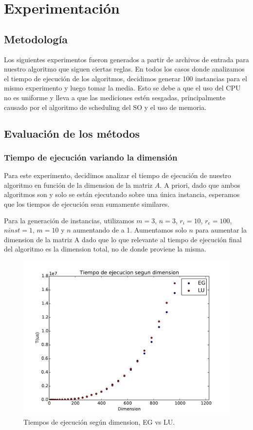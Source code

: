 \section{Experimentación}

\subsection{Metodología}

Los siguientes experimentos fueron generados a partir de archivos de entrada para nuestro algoritmo que siguen ciertas reglas. En todos los casos donde analizamos el tiempo de ejecución de los algoritmos, decidimos generar 100 instancias para el mismo experimento y luego tomar la media. Esto se debe a que el uso del CPU no es uniforme y lleva a que las mediciones estén sesgadas, principalmente causado por el algoritmo de scheduling del SO y el uso de memoria.

\subsection{Evaluación de los métodos}

\subsubsection{Tiempo de ejecución variando la dimensión}

Para este experimento, decidimos analizar el tiempo de ejecución de nuestro algoritmo en función de la dimension de la matriz $A$. A priori, dado que ambos algoritmos son  y solo se están ejecutando sobre una única instancia, esperamos que los tiempos de ejecución sean sumamente similares.

Para la generación de instancias, utilizamos $m = 3$, $n = 3$, $r_i = 10$, $r_e = 100$, $ninst = 1$, $m = 10$ y $n$ aumentando de a 1. Aumentamos solo $n$ para aumentar la dimension de la matriz A dado que lo que relevante al tiempo de ejecución final del algoritmo es la dimension total, no de donde proviene la misma.

\begin{figure}[h]
\centering
\includegraphics[scale=0.7]{graficos/dimVariable.pdf}
\caption{Tiempos de ejecución según dimension, EG vs LU.}
\label{timeDim}
\end{figure}

